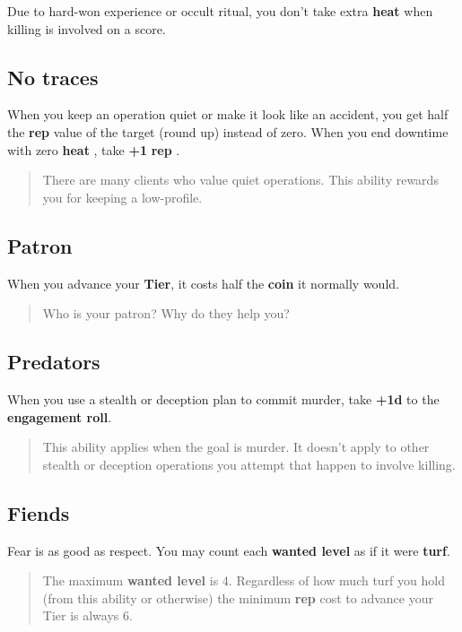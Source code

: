 \documentclass[11pt,oneside]{book}
\newcommand{\gameterm}[1]{\textbf{#1}}
\begin{document}
Due to hard-won experience or occult ritual, you don’t take extra \gameterm{heat}  when killing is involved on a score.

\subsection{No traces}

When you keep an operation quiet or make it look like an accident, you get half the \gameterm{rep}  value of the target (round up) instead of zero. When you end downtime with zero \gameterm{heat} , take \textbf{+1} \gameterm{rep} .

\begin{quote}
	There are many clients who value quiet operations. This ability rewards you for keeping a low-profile.
\end{quote} 

\subsection{Patron}

When you advance your \textbf{Tier}, it costs half the \gameterm{coin}  it normally would.

\begin{quote}
	Who is your patron? Why do they help you?
\end{quote} 

\subsection{Predators}

When you use a stealth or deception plan to commit murder, take \textbf{+1d} to the \textbf{engagement roll}.

\begin{quote}
	This ability applies when the goal is murder. It doesn’t apply to other stealth or deception operations you attempt that happen to involve killing.
\end{quote} 

\subsection{Fiends}

Fear is as good as respect. You may count each \gameterm{wanted level}  as if it were \textbf{turf}.

\begin{quote}
	The maximum \gameterm{wanted level}  is 4. Regardless of how much turf you hold (from this ability or otherwise) the minimum \gameterm{rep}  cost to advance your Tier is always 6.
\end{quote} 
\end{document}
